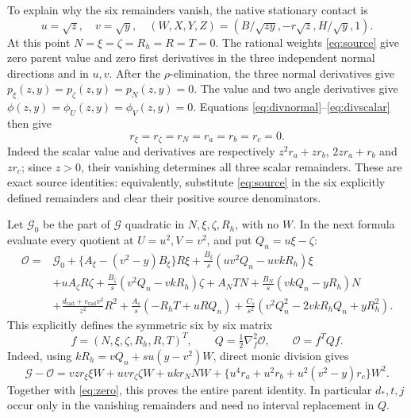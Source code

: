 \documentclass[10pt]{article}
\begin{document}
To explain why the six remainders vanish, the native stationary contact is
\[
 u=\sqrt z,\quad v=\sqrt y,\quad
 (W,X,Y,Z)=\left(B/\sqrt{zy},-r\sqrt z,H/\sqrt y,1\right).
\]
At this point \(N=\xi=\zeta=R_h=R=T=0\).
The rational weights \eqref{eq:source} give zero parent value and zero
first derivatives in the three independent normal directions and in
\(u,v\). After the \(\rho\)-elimination, the three normal derivatives give
\(p_\xi(z,y)=p_\zeta(z,y)=p_N(z,y)=0\).
The value and two angle derivatives give
\(\phi(z,y)=\phi_U(z,y)=\phi_V(z,y)=0\).
Equations \eqref{eq:divnormal}--\eqref{eq:divscalar} then give
\begin{equation}
 r_\xi=r_\zeta=r_N=r_a=r_b=r_c=0.                    \label{eq:zero}
\end{equation}
Indeed the scalar value and derivatives are respectively
$z^2r_a+zr_b$, $2zr_a+r_b$ and $zr_c$; since $z>0$,
their vanishing determines all three scalar remainders.
These are exact source identities: equivalently, substitute
\eqref{eq:source} in the six explicitly defined remainders and clear
their positive source denominators.

Let \(\mathcal G_0\) be the part of \(\mathcal G\) quadratic in
\(N,\xi,\zeta,R_h\), with no \(W\). In the next formula evaluate every
quotient at \(U=u^2,V=v^2\), and put \(Q_n=u\xi-\zeta\):
\begin{equation}
\begin{split}
 \mathcal O={}&\mathcal G_0+
 \{A_\xi-(v^2-y)B_\xi\}R\xi
 +\frac{B_\xi}{s}(uv^2Q_n-uvkR_h)\xi\\
 &+uA_\zeta R\zeta+\frac{B_\zeta}{s}(v^2Q_n-vkR_h)\zeta
 +A_NTN+\frac{B_N}{s}(vkQ_n-yR_h)N\\
 &+\frac{d_{\mathrm{rad}}+e_{\mathrm{rad}}v^2}{z^2}R^2
 +\frac{A_s}{s}(-R_hT+uRQ_n)
 +\frac{C_s}{s^2}(v^2Q_n^2-2vkR_hQ_n+yR_h^2).
\end{split}\label{eq:O}
\end{equation}
This explicitly defines the symmetric six by six matrix
\[
 f=(N,\xi,\zeta,R_h,R,T)^T,\qquad
 Q=\tfrac12\nabla_f^2\mathcal O,\qquad \mathcal O=f^TQf.
\]
Indeed, using \(kR_h=vQ_n+su(y-v^2)W\), direct monic division gives
\begin{equation}
 \mathcal G-\mathcal O=
 vzr_\xi\xi W+uvr_\zeta\zeta W+ukr_NNW+
 \{u^4r_a+u^2r_b+u^2(v^2-y)r_c\}W^2.               \label{eq:exactdifference}
\end{equation}
Together with \eqref{eq:zero}, this proves the entire parent identity.
In particular \(d_*,t,j\) occur only in the vanishing remainders and
need no interval replacement in \(Q\).
\end{document}
